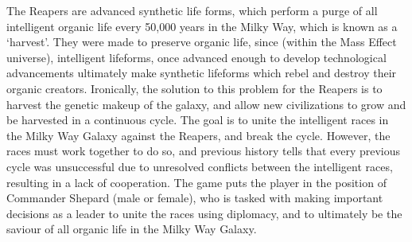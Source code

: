 \documentclass[journal]{IEEEtran}
\begin{document}
The Reapers are advanced synthetic life forms, which perform a purge of all intelligent organic life every 50,000 years in the Milky Way, which is known as a `harvest'. They were made to preserve organic life, since
(within the Mass Effect universe), intelligent lifeforms, once advanced
enough to develop technological advancements ultimately make synthetic
lifeforms which rebel and destroy their organic creators. Ironically,
the solution to this problem for the Reapers is to harvest the genetic makeup
of the galaxy, and allow new civilizations to grow and be harvested in a continuous cycle. The goal is to unite the intelligent
races in the Milky Way Galaxy against the Reapers, and break the cycle.
However, the races must work together to do so,
and previous history tells that every previous cycle was
unsuccessful due to unresolved conflicts between the intelligent races, resulting in a lack of cooperation. The game puts the player in the position of Commander Shepard (male or female), who is tasked with making important decisions as a leader to unite the races using diplomacy, and to ultimately be the saviour of all organic life in the Milky Way Galaxy.
\end{document}
